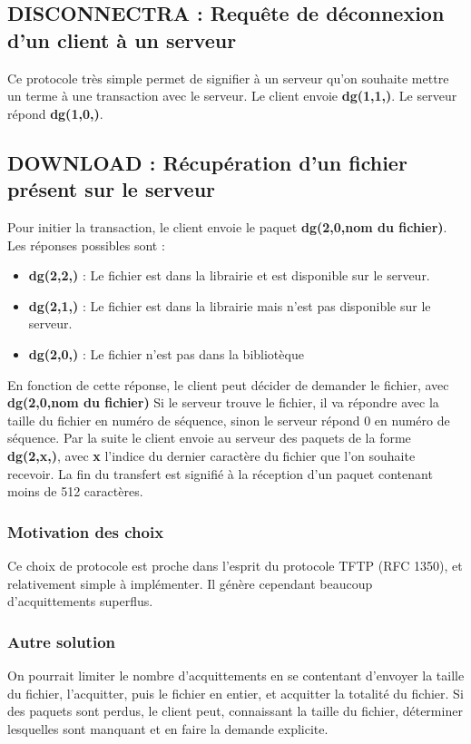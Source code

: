 \documentclass[10pt,a4paper]{article}
\begin{document}
\subsection{DISCONNECTRA : Requête de déconnexion d'un client à un serveur}
Ce protocole très simple permet de signifier à un serveur qu'on souhaite mettre un terme à une transaction avec le serveur.
Le client envoie \textbf{dg(1,1,)}. Le serveur répond \textbf{dg(1,0,)}.

\subsection{DOWNLOAD : Récupération d'un fichier présent sur le serveur}
Pour initier la transaction, le client envoie le paquet \textbf{dg(2,0,nom du fichier)}.
Les réponses possibles sont :
\begin{itemize}
 \item \textbf{dg(2,2,)} : Le fichier est dans la librairie et est disponible sur le serveur.
 \item \textbf{dg(2,1,)} : Le fichier est dans la librairie mais n'est pas disponible sur le serveur.
 \item \textbf{dg(2,0,)} : Le fichier n'est pas dans la bibliotèque
\end{itemize}

En fonction de cette réponse, le client peut décider de demander le fichier, avec \textbf{dg(2,0,nom du fichier)}
Si le serveur trouve le fichier, il va répondre avec la taille du fichier en numéro de séquence, sinon le serveur répond 0 en numéro de séquence.
Par la suite le client envoie au serveur des paquets de la forme \textbf{dg(2,x,)}, avec \textbf{x} l'indice du dernier caractère du fichier que l'on souhaite recevoir.
La fin du transfert est signifié à la réception d'un paquet contenant moins de 512 caractères.

\subsubsection{Motivation des choix}
Ce choix de protocole est proche dans l'esprit du protocole TFTP (RFC 1350), et relativement simple à implémenter. Il génère cependant beaucoup d'acquittements superflus.
\subsubsection{Autre solution}
On pourrait limiter le nombre d'acquittements en se contentant d'envoyer la taille du fichier, l'acquitter, puis le fichier en entier, et acquitter la totalité du fichier. Si des paquets sont perdus, le client peut, connaissant la taille du fichier, déterminer lesquelles sont manquant et en faire la demande explicite.
\end{document}
